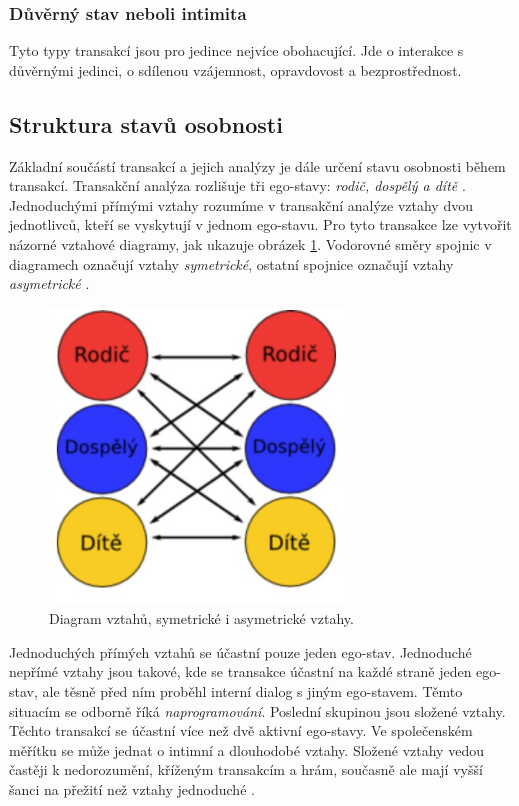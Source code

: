 \subsubsection*{Důvěrný stav neboli intimita}
Tyto typy transakcí jsou pro jedince nejvíce obohacující. 
Jde o interakce s důvěrnými jedinci, o sdílenou vzájemnost, opravdovost a bezprostřednost.\\

\subsection*{Struktura stavů osobnosti}

Základní součástí transakcí a jejich analýzy je dále určení stavu osobnosti během transakcí. 
Transakční analýza rozlišuje tři ego-stavy: {\it rodič, dospělý a dítě} \cite{transakcni_analyza_cata}.
Jednoduchými přímými vztahy rozumíme v transakční analýze vztahy dvou jednotlivců, kteří se vyskytují v jednom ego-stavu. Pro tyto transakce lze vytvořit názorné vztahové diagramy, jak ukazuje obrázek \ref{fig:diagram_vztahu}. Vodorovné směry spojnic v diagramech označují vztahy {\it symetrické}, ostatní spojnice označují vztahy {\it asymetrické} \cite{sex_v_lidskem_milovani}. 

    \begin{figure}[h]
        \centering
        \includegraphics[width=0.7\textwidth]{pictures/diagram_vztahovy.png}
        \caption{Diagram vztahů, symetrické i asymetrické vztahy. \cite{everesta}}
        \label{fig:diagram_vztahu}
    \end{figure}{}

Jednoduchých přímých vztahů se účastní pouze jeden ego-stav. 
Jednoduché nepřímé vztahy jsou takové, kde se transakce účastní na každé straně jeden ego-stav, ale těsně před ním proběhl interní dialog s jiným ego-stavem. 
Těmto situacím se odborně říká {\it naprogramování}. 
Poslední skupinou jsou složené vztahy. Těchto transakcí se účastní více než dvě aktivní ego-stavy. 
Ve společenském měřítku se může jednat o intimní a dlouhodobé vztahy. 
Složené vztahy vedou častěji k nedorozumění, kříženým transakcím a hrám, 
současně ale mají vyšší šanci na přežití než vztahy jednoduché \cite{sex_v_lidskem_milovani}.\\

